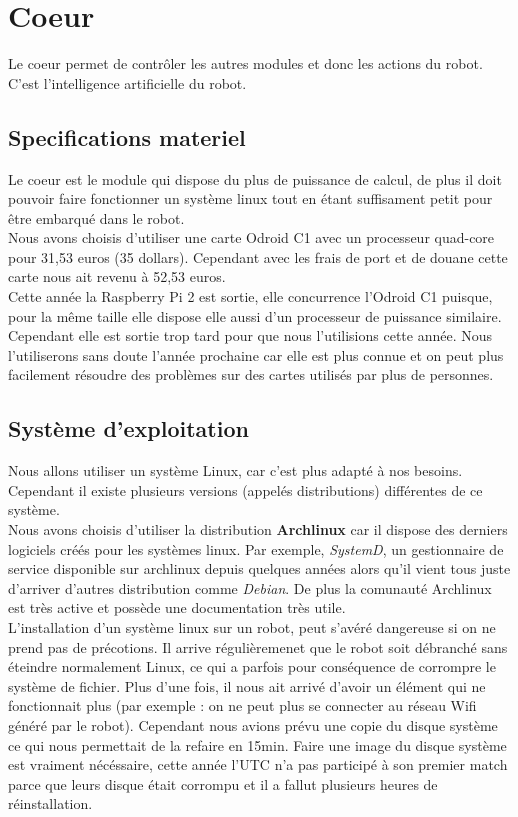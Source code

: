 \chapter{Coeur}

	Le coeur permet de contrôler les autres modules et donc les actions du robot. C'est l'intelligence artificielle du robot.


	\section{Specifications materiel}
	Le coeur est le module qui dispose du plus de puissance de calcul, de plus il doit pouvoir faire fonctionner un système linux tout en étant suffisament petit pour être embarqué dans le robot.\\

	Nous avons choisis d'utiliser une carte Odroid C1 avec un processeur quad-core pour 31,53 euros (35 dollars). Cependant avec les frais de port et de douane cette carte nous ait revenu à 52,53 euros.\\

	Cette année la Raspberry Pi 2 est sortie, elle concurrence l'Odroid C1 puisque, pour la même taille elle dispose elle aussi d'un processeur de puissance similaire. Cependant elle est sortie trop tard pour que nous l'utilisions cette année. Nous l'utiliserons sans doute l'année prochaine car elle est plus connue et on peut plus facilement résoudre des problèmes sur des cartes utilisés par plus de personnes.

	\section{Système d'exploitation}
	Nous allons utiliser un système Linux, car c'est plus adapté à nos besoins. Cependant il existe plusieurs versions (appelés distributions) différentes de ce système.\\

	Nous avons choisis d'utiliser la distribution \textbf{Archlinux} car il dispose des derniers logiciels créés pour les systèmes linux. Par exemple, \textit{SystemD}, un gestionnaire de service disponible sur archlinux depuis quelques années alors qu'il vient tous juste d'arriver d'autres distribution comme \textit{Debian}. De plus la comunauté Archlinux est très active et possède une documentation très utile.\\

	L'installation d'un système linux sur un robot, peut s'avéré dangereuse si on ne prend pas de précotions. Il arrive régulièremenet que le robot soit débranché sans éteindre normalement Linux, ce qui a parfois pour conséquence de corrompre le système de fichier. Plus d'une fois, il nous ait arrivé d'avoir un élément qui ne fonctionnait plus (par exemple : on ne peut plus se connecter au réseau Wifi généré par le robot). Cependant nous avions prévu une copie du disque système ce qui nous permettait de la refaire en 15min. Faire une image du disque système est vraiment nécéssaire, cette année l'UTC n'a pas participé à son premier match parce que leurs disque était corrompu et il a fallut plusieurs heures de réinstallation.\\

